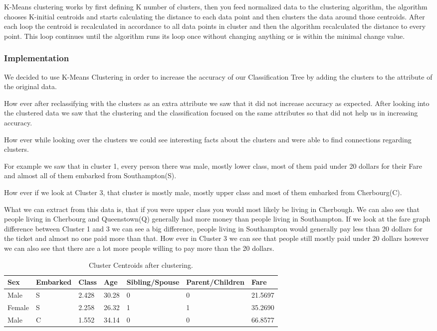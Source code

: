 \documentclass[a4paper,11pt]{article}
\begin{document}
K-Means clustering works by first defining K number of  clusters, then you feed normalized data to the clustering algorithm, the algorithm chooses K-initial centroids and starts calculating the distance to each data point and then clusters the data around those centroids. After each loop the centroid is recalculated in accordance to all data points in cluster and then the algorithm recalculated the distance to every point. This loop continues until the algorithm runs its loop once without changing anything or is within the minimal change value.
\subsubsection{Implementation}
We decided to use K-Means Clustering in order to increase the accuracy of our Classification Tree by adding the clusters to the attribute of the original data.

How ever after reclassifying with the clusters as an extra attribute we saw that it did not increase accuracy as expected. After looking into the clustered data we saw that the clustering and the classification focused on the same attributes so that did not help us in increasing accuracy.

How ever while looking over the clusters we could see interesting facts about the clusters and were able to find connections regarding clusters.

For example we saw that in cluster 1, every person there was male, mostly lower class, most of them paid under 20 dollars for their Fare and almost all of them embarked from Southampton(S).

How ever if we look at Cluster 3, that cluster is mostly male, mostly upper class and most of them embarked from Cherbourg(C).

What we can extract from this data is, that if you were upper class you would most likely be living in Cherbough.
We can also see that people living in Cherbourg and Queenstown(Q) generally had more money than people living in Southampton. If we look at the fare graph difference between Cluster 1 and 3 we can see a big difference, people living in Southampton would generally pay less than 20 dollars for the ticket and almost no one paid more than that. How ever in Cluster 3 we can see that people still mostly paid under 20 dollars however we can also see that there are a lot more people willing to pay more than the 20 dollars.

\begin{table}[h]
\begin{tabular}{|l|l|l|l|l|l|l|}
\hline
Sex & Embarked & Class & Age & Sibling/Spouse & Parent/Children & Fare\\
\hline
Male & S & 2.428 & 30.28 & 0 & 0 & 21.5697\\
Female & S & 2.258 & 26.32 & 1 & 1 & 35.2690\\
Male & C & 1.552 & 34.14 & 0 & 0 & 66.8577\\
\hline
\end{tabular}
\caption{Cluster Centroids after clustering.}
\label{clusterCentroids}
\end{table}
\end{document}
